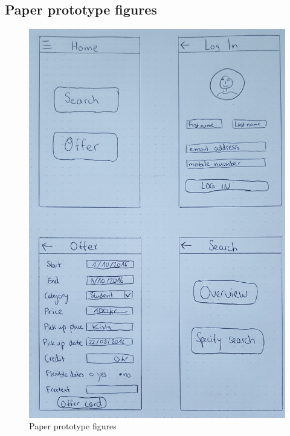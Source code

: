 \documentclass[11pt,twoside,a4paper]{report}
\begin{document}
\begin{appendices}

\chapter{Paper prototype figures}
\newpage

\begin{figure}
	\centering
	\includegraphics[width=\textwidth]{jpg/paper-prototype-1.jpg}
	\caption{Paper prototype figures}
	\label{figure:paper-prototype-1}
\end{figure}


\end{appendices}
\end{document}
